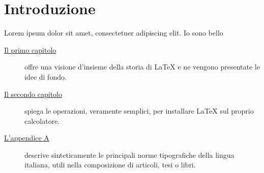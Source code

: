 
\cleardoublepage
{}

\chapter*{Introduzione}

\lipsum[1]

Lorem ipsum dolor sit amet, consectetuer adipiscing elit.
Io sono bello
\begin{description}
\item[{\hyperref[cap:lorem]{Il primo capitolo}}]
offre una visione d'insieme della storia di \LaTeX{} e ne vengono presentate le idee di fondo.
\item[{\hyperref[cap:ipsum]{Il secondo capitolo}}]
spiega le operazioni, veramente semplici, per installare \LaTeX{} sul proprio calcolatore.
\item[{\hyperref[cap:dolor]{L'appendice A}}] descrive  sinteticamente le principali norme tipografiche della lingua italiana, utili nella composizione di articoli, tesi o libri.
\end{description}

\lipsum[2]
